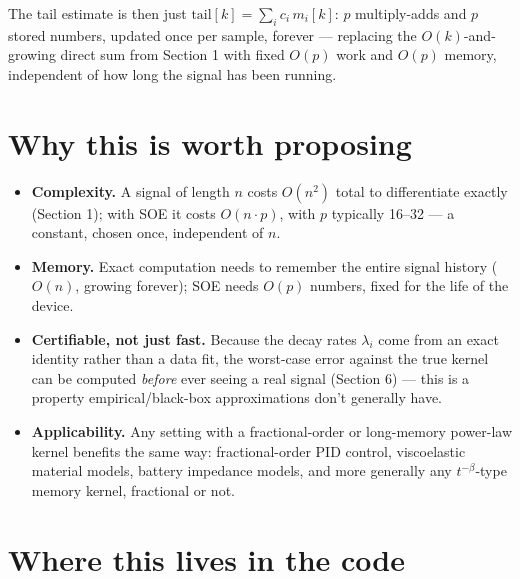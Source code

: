 \documentclass[11pt]{article}
\begin{document}
The tail estimate is then just $\text{tail}[k] = \sum_i c_i\, m_i[k]$: $p$ multiply-adds and $p$ stored numbers, updated once per sample, forever --- replacing the $O(k)$-and-growing direct sum from Section 1 with fixed $O(p)$ work and $O(p)$ memory, independent of how long the signal has been running.

\section{Why this is worth proposing}

\begin{itemize}
\item \textbf{Complexity.} A signal of length $n$ costs $O(n^2)$ total to differentiate exactly (Section 1); with SOE it costs $O(n\cdot p)$, with $p$ typically 16--32 --- a constant, chosen once, independent of $n$.
\item \textbf{Memory.} Exact computation needs to remember the entire signal history ($O(n)$, growing forever); SOE needs $O(p)$ numbers, fixed for the life of the device.
\item \textbf{Certifiable, not just fast.} Because the decay rates $\lambda_i$ come from an exact identity rather than a data fit, the worst-case error against the true kernel can be computed \emph{before} ever seeing a real signal (Section 6) --- this is a property empirical/black-box approximations don't generally have.
\item \textbf{Applicability.} Any setting with a fractional-order or long-memory power-law kernel benefits the same way: fractional-order PID control, viscoelastic material models, battery impedance models, and more generally any $t^{-\beta}$-type memory kernel, fractional or not.
\end{itemize}

\section{Where this lives in the code}
\end{document}
